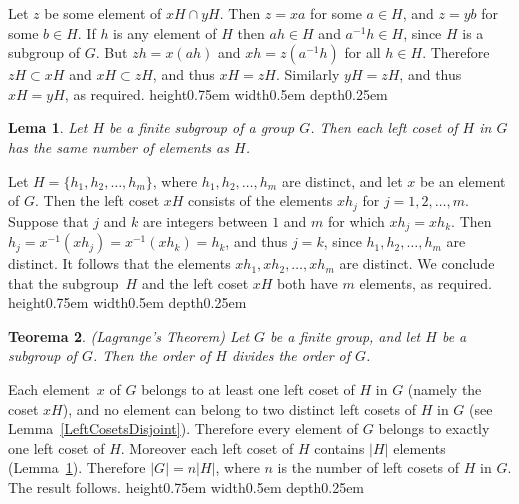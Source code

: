 \documentclass[a4paper]{article}
\newtheorem{theorem}{Teorema}[section]
\newtheorem{lemma}[theorem]{Lema}
\newenvironment{proof}[1][Prova]{\begin{trivlist}
\item[\hskip \labelsep {\bfseries #1}]}{\end{trivlist}}
\newcommand{\qed}{\nobreak \ifvmode \relax \else
      \ifdim\lastskip<1.5em \hskip-\lastskip
      \hskip1.5em plus0em minus0.5em \fi \nobreak
      \vrule height0.75em width0.5em depth0.25em\fi}
\begin{document}
\begin{proof}
Let $z$ be some element of $xH \cap yH$.  Then $z = xa$ for some $a \in H$, and $z = yb$ for some $b \in H$. If $h$ is any element of $H$ then $ah \in H$ and $a^{-1}h \in H$, since $H$ is a subgroup of $G$. But $zh = x(ah)$ and $xh = z(a^{-1}h)$ for all $h \in H$. Therefore $zH \subset xH$ and $xH \subset zH$, and thus $xH = zH$.  Similarly $yH = zH$, and thus $xH = yH$, as required.\qed
\end{proof}

\begin{lemma}
\label{SizeOfLeftCoset}
Let $H$ be a finite subgroup of a group $G$.  Then each left coset of $H$ in $G$ has the same number of elements as $H$.
\end{lemma}

\begin{proof}
Let $H = \{ h_1, h_2,\ldots, h_m\}$, where $h_1, h_2,\ldots, h_m$ are distinct, and let $x$ be an element of $G$.  Then the left coset $xH$ consists of the elements $x h_j$ for $j = 1,2,\ldots,m$. Suppose that $j$ and $k$ are integers between $1$ and $m$ for which $x h_j = x h_k$.  Then $h_j = x^{-1} (x h_j) = x^{-1} (x h_k) = h_k$, and thus $j = k$, since $h_1, h_2,\ldots, h_m$ are distinct.  It follows that the elements $x h_1, x h_2,\ldots, x h_m$ are distinct. We conclude that the subgroup~$H$ and the left coset $xH$ both have $m$ elements, as required.\qed
\end{proof}

\begin{theorem}
\emph{(Lagrange's Theorem)}
\label{Lagrange}
Let $G$ be a finite group, and let $H$ be a subgroup of $G$.  Then the order of $H$ divides the order of $G$.
\end{theorem}

\begin{proof}
Each element~$x$ of $G$ belongs to at least one left coset of $H$ in $G$ (namely the coset $xH$), and no element can belong to two distinct left cosets of $H$ in $G$ (see Lemma~\ref{LeftCosetsDisjoint}).  Therefore every element of $G$ belongs to exactly one left coset of $H$. Moreover each left coset of $H$ contains $|H|$ elements (Lemma~\ref{SizeOfLeftCoset}).  Therefore $|G| = n |H|$, where $n$ is the number of left cosets of $H$ in $G$. The result follows.\qed
\end{proof}
\end{document}
